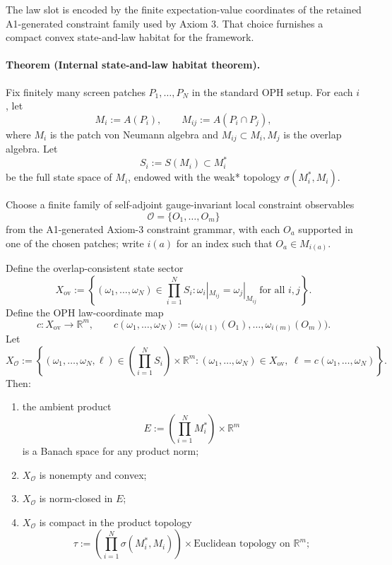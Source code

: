 The law slot is encoded by the finite expectation-value coordinates of the retained A1-generated
constraint family used by Axiom 3. That choice furnishes a compact convex state-and-law habitat
for the framework.

\paragraph{Theorem (Internal state-and-law habitat theorem).}
Fix finitely many screen patches \(P_1,\dots,P_N\) in the standard OPH setup. For each \(i\), let
\[
M_i:=A(P_i),
\qquad
M_{ij}:=A(P_i\cap P_j),
\]
where \(M_i\) is the patch von Neumann algebra and \(M_{ij}\subset M_i,M_j\) is the overlap
algebra. Let
\[
S_i:=S(M_i)\subset M_i^*
\]
be the full state space of \(M_i\), endowed with the weak* topology \(\sigma(M_i^*,M_i)\).

Choose a finite family of self-adjoint gauge-invariant local constraint observables
\[
\mathcal O=\{O_1,\dots,O_m\}
\]
from the A1-generated Axiom-3 constraint grammar, with each \(O_a\) supported in one of the chosen patches; write
\(i(a)\) for an index such that \(O_a\in M_{i(a)}\).

Define the overlap-consistent state sector
\[
X_{\mathrm{ov}}
:=
\left\{
(\omega_1,\dots,\omega_N)\in \prod_{i=1}^N S_i:
\omega_i|_{M_{ij}}=\omega_j|_{M_{ij}}\ \text{for all }i,j
\right\}.
\]
Define the OPH law-coordinate map
\[
c:X_{\mathrm{ov}}\to \mathbb R^m,
\qquad
c(\omega_1,\dots,\omega_N)
:=
\bigl(\omega_{i(1)}(O_1),\dots,\omega_{i(m)}(O_m)\bigr).
\]
Let
\[
X_{\mathcal O}
:=
\left\{
(\omega_1,\dots,\omega_N,\ell)\in
\left(\prod_{i=1}^N S_i\right)\times \mathbb R^m:
(\omega_1,\dots,\omega_N)\in X_{\mathrm{ov}},
\ \ell=c(\omega_1,\dots,\omega_N)
\right\}.
\]
Then:
\begin{enumerate}
\item the ambient product
\[
E:=
\left(\prod_{i=1}^N M_i^*\right)\times \mathbb R^m
\]
is a Banach space for any product norm;
\item \(X_{\mathcal O}\) is nonempty and convex;
\item \(X_{\mathcal O}\) is norm-closed in \(E\);
\item \(X_{\mathcal O}\) is compact in the product topology
\[
\tau
:=
\left(\prod_{i=1}^N \sigma(M_i^*,M_i)\right)\times
\text{Euclidean topology on }\mathbb R^m;
\]
\end{enumerate}

